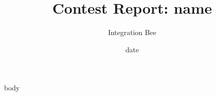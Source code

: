 \documentclass{article}
\begin{document}
\title{Contest Report: \textbf{ {{ name }} }}
\author{Integration Bee}
\date{ {{ date }} }
\maketitle

{{ body }}
\end{document}
